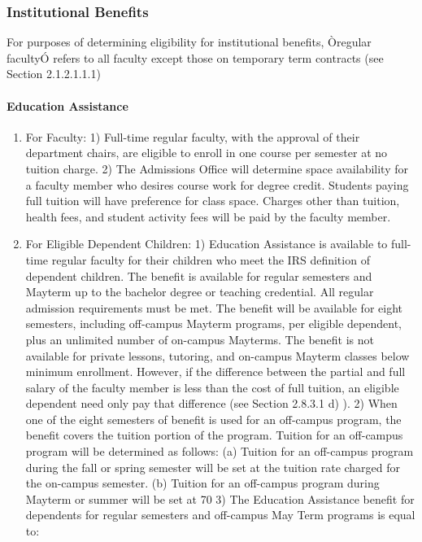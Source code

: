 \documentclass[letterpaper, 11pt]{article}
\begin{document}
		\subsubsection{Institutional Benefits}
			For purposes of determining eligibility for institutional benefits, Òregular facultyÓ refers to all faculty except those on temporary term contracts (see Section 2.1.2.1.1.1)
			\paragraph{Education Assistance}
				\begin{enumerate}[label=\alph*)]
					\item{For Faculty:}
					1) Full-time regular faculty, with the approval of their department chairs, are eligible to enroll in one course per semester at no tuition charge.
					2) The Admissions Office will determine space availability for a faculty member who desires course work for degree credit.  Students paying full tuition will have preference for class space.  Charges other than tuition, health fees, and student activity fees will be paid by the faculty member.
					\item{For Eligible Dependent Children:}
					1) Education Assistance is available to full-time regular faculty for their children who meet the IRS definition of dependent children.  The benefit is available for regular semesters and Mayterm up to the bachelor degree or teaching credential. All regular admission requirements must be met.  The benefit will be available for eight semesters, including off-campus Mayterm programs, per eligible dependent, plus an unlimited number of on-campus Mayterms.  The benefit is not available for private lessons, tutoring, and on-campus Mayterm classes below minimum enrollment.  However, if the difference between the partial and full salary of the faculty member is less than the cost of full tuition, an eligible dependent need only pay that difference (see Section 2.8.3.1 d) ).
					2) When one of the eight semesters of benefit is used for an off-campus program, the benefit covers the tuition portion of the program.  Tuition for an off-campus program will be determined as follows:
					(a) Tuition for an off-campus program during the fall or spring semester will be set at the tuition rate charged for the on-campus semester.
					(b) Tuition for an off-campus program during Mayterm or summer will be set at 70%
					3) The Education Assistance benefit for dependents for regular semesters and off-campus May Term programs is equal to:


\end{enumerate}
\end{document}
